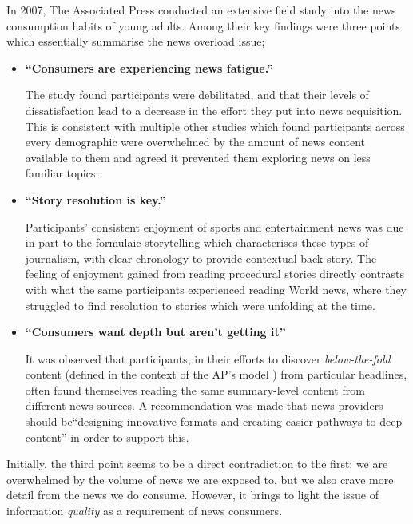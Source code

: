 In 2007, The Associated Press conducted an extensive field study \citep{anewmodelfornews} into the news consumption habits of young adults. Among their key findings were three points which essentially summarise the news overload issue;
\begin{itemize}
	\item \textbf{``Consumers are experiencing news fatigue.''} \par
	The study found participants were debilitated, and that their levels of dissatisfaction lead to a decrease in the effort they put into news acquisition. This is consistent with multiple other studies \citep{newsandtheoverloadedcustomer, UnderstandingTheParticipatoryNewsConsumer, InformationAccessinComplexPoorlyStructuredInformationSpaces} which found participants across every demographic were overwhelmed by the amount of news content available to them and agreed it prevented them exploring news on less familiar topics. 
	
	\item \textbf{``Story resolution is key.''} \par
	Participants' consistent enjoyment of sports and entertainment news was due in part to the formulaic storytelling which characterises these types of journalism, with clear chronology to provide contextual back story. The feeling of enjoyment gained from reading procedural stories directly contrasts with what the same participants experienced reading World news, where they struggled to find resolution to stories which were unfolding at the time.
	
	\item \textbf{``Consumers want depth but aren't getting it''} \par
	It was observed that participants, in their efforts to discover \textit{below-the-fold} content (defined in the context of the AP's model \citep[p.37]{anewmodelfornews}) from particular headlines, often found themselves reading the same summary-level content from different news sources. A recommendation was made that news providers should be``designing innovative formats and creating easier pathways to deep content'' \citep[p.49]{anewmodelfornews} in order to support this.
\end{itemize}

Initially, the third point seems to be a direct contradiction to the first; we are overwhelmed by the volume of news we are exposed to, but we also crave more detail from the news we do consume. However, it brings to light the issue of information \textit{quality} as a requirement of news consumers.

